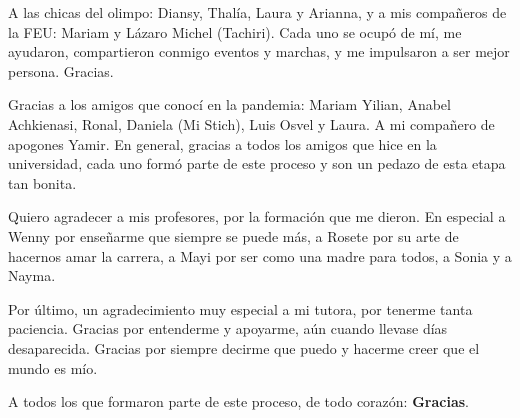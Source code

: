  A las chicas del olimpo: Diansy, Thalía, Laura y Arianna, y a mis compañeros de la FEU: Mariam y Lázaro Michel (Tachiri). Cada uno se ocupó de mí, me ayudaron, compartieron conmigo eventos y marchas, y me impulsaron a ser mejor persona. Gracias.
 
Gracias a los amigos que conocí en la pandemia: Mariam Yilian, Anabel Achkienasi, Ronal, Daniela (Mi Stich), Luis Osvel y Laura. A mi compañero de apogones Yamir. En general, gracias a todos los amigos que hice en la universidad, cada uno formó parte de este proceso y son un pedazo de esta etapa tan bonita.

Quiero agradecer a mis profesores, por la formación que me dieron. En especial a Wenny por enseñarme que siempre se puede más, a Rosete por su arte de hacernos amar la carrera, a Mayi por ser como una madre para todos, a Sonia y a Nayma.

Por último, un agradecimiento muy especial a mi tutora, por tenerme tanta paciencia. Gracias por entenderme y apoyarme, aún cuando llevase días desaparecida. Gracias por siempre decirme que puedo y hacerme creer que el mundo es mío.

A todos los que formaron parte de este proceso, de todo corazón: \textbf{Gracias}.